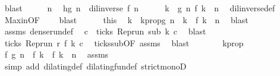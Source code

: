 \begin{isabellebody}
\ blast\isanewline
\ \ \isacommand{{\isacharbraceleft}}\isamarkupfalse%
\ \isamarkupfalse%
\ n\ \isamarkupfalse%
\ h{\isacharcolon}{\isacartoucheopen}g\ n\ {\isacharless}\ {\isacharparenleft}dil{\isacharunderscore}inverse\ f{\isacharparenright}\ n{\isacartoucheclose}\isanewline
\ \ \ \ \isamarkupfalse%
\ {\isacartoucheopen}{\isasymexists}k\ {\isachargreater}\ g\ n{\isachardot}\ f\ k\ {\isasymle}\ n{\isacartoucheclose}\ \isamarkupfalse%
\ dil{\isacharunderscore}inverse{\isacharunderscore}def\ \isamarkupfalse%
\ Max{\isacharunderscore}in{\isacharbrackleft}OF\ {\isacharasterisk}\ {\isacharasterisk}{\isacharasterisk}{\isacharbrackright}\ \isamarkupfalse%
\ blast\isanewline
\ \ \ \ \isamarkupfalse%
\ this\ \isamarkupfalse%
\ k\ \ kprop{\isacharcolon}{\isacartoucheopen}g\ n\ {\isacharless}\ k\ {\isasymand}\ f\ k\ {\isasymle}\ n{\isacartoucheclose}\ \isamarkupfalse%
\ blast\isanewline
\ \ \ \ \isamarkupfalse%
\ assms{\isacharparenleft}{}{\isacharparenright}\ dense{\isacharunderscore}run{\isacharunderscore}def\ \isamarkupfalse%
\ c\ \ {\isacartoucheopen}ticks\ {\isacharparenleft}{\isacharparenleft}Rep{\isacharunderscore}run\ sub{\isacharparenright}\ k\ c{\isacharparenright}{\isacartoucheclose}\ \isamarkupfalse%
\ blast\isanewline
\ \ \ \ \isamarkupfalse%
\ {\isacartoucheopen}ticks\ {\isacharparenleft}{\isacharparenleft}Rep{\isacharunderscore}run\ r{\isacharparenright}\ {\isacharparenleft}f\ k{\isacharparenright}\ c{\isacharparenright}{\isacartoucheclose}\ \isamarkupfalse%
\ ticks{\isacharunderscore}sub{\isacharbrackleft}OF\ assms{\isacharparenleft}{}{\isacharparenright}{\isacharbrackright}\ \isamarkupfalse%
\ blast\isanewline
\ \ \ \ \isamarkupfalse%
\ \isamarkupfalse%
\ kprop\ \isamarkupfalse%
\ {\isacartoucheopen}f\ {\isacharparenleft}g\ n{\isacharparenright}\ {\isacharless}\ f\ k\ {\isasymand}\ f\ k\ {\isasymle}\ n{\isacartoucheclose}\ \isamarkupfalse%
\ assms{\isacharparenleft}{}{\isacharparenright}\isanewline
\ \ \ \ \ \ \isamarkupfalse%
\ {\isacharparenleft}simp\ add{\isacharcolon}\ dilating{\isacharunderscore}def\ dilating{\isacharunderscore}fun{\isacharunderscore}def\ strict{\isacharunderscore}monoD{\isacharparenright}\isanewline
\ \ \ \ \isamarkupfalse%

\end{isabellebody}
